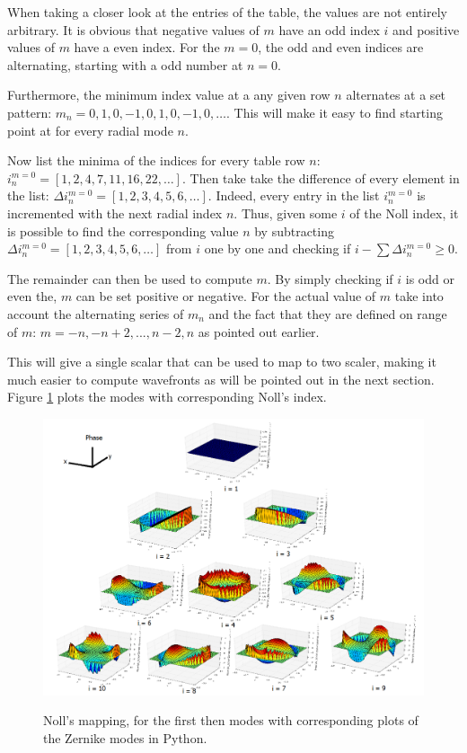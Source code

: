 \documentclass{article}
\begin{document}
When taking a closer look at the entries of the table, the values are not entirely arbitrary. It is obvious that negative values of $m$ have an odd index $i$ and positive values of $m$ have a even index. For the $m=0$, the odd and even indices are alternating, starting with a odd number at $n=0$.

Furthermore, the minimum index value at a any given row $n$ alternates at a set pattern: $m_n = 0,1,0,-1,0,1,0,-1,0,\dots$. This will make it easy to find starting point at for every radial mode $n$.

Now list the minima of the indices for every table row $n$: $i_{n}^{m=0} = [1,2,4,7,11,16,22,\dots]$. Then take take the difference of every element in the list: $\Delta i_{n}^{m=0} = [1,2,3,4,5,6,\dots]$. Indeed, every entry in the list $i_{n}^{m=0}$ is incremented with the next radial index $n$.
Thus, given some $i$ of the Noll index, it is possible to find the corresponding value $n$ by subtracting $\Delta i_{n}^{m=0} = [1,2,3,4,5,6,\dots]$ from $i$ one by one and checking if $i - \sum \Delta i_{n}^{m=0} \geq 0$.

The remainder can then be used to compute $m$.  By simply checking if $i$ is odd or even the, $m$ can be set positive or negative. For the actual value of $m$ take into account the alternating series of $m_n$ and the fact that they are defined on  range of $m$: $m = -n, -n+2,...,n-2,n$ as pointed out earlier.

This will give a single scalar that can be used to map to two scaler, making it much easier to compute wavefronts as will be pointed out in the next section. Figure \ref{fig_wfg06} plots the modes with corresponding Noll's index.

\newpage
\begin{figure}[H]
	\center
	\includegraphics[width=1.0\textwidth, height=1\textwidth]{Figures/Nollsmap.png}
	\label{fig_wfg06}
	\caption{Noll's mapping, for the first then modes with corresponding plots of the Zernike modes in Python.}
\end{figure}
\end{document}

